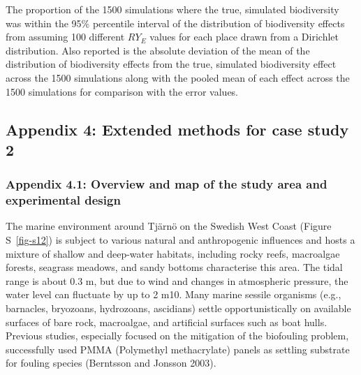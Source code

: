 \documentclass[
  letterpaper,
  DIV=11,
  numbers=noendperiod]{scrartcl}
\begin{document}
\begin{table}

\caption{\label{tbl-s7}The proportion of the 1500 simulations where the
true, simulated biodiversity was within the 95\% percentile interval of
the distribution of biodiversity effects from assuming 100 different
\(RY_E\) values for each place drawn from a Dirichlet distribution. Also
reported is the absolute deviation of the mean of the distribution of
biodiversity effects from the true, simulated biodiversity effect across
the 1500 simulations along with the pooled mean of each effect across
the 1500 simulations for comparison with the error values.}


\end{table}%

\subsection{Appendix 4: Extended methods for case study
2}\label{appendix-4-extended-methods-for-case-study-2}

\subsubsection{Appendix 4.1: Overview and map of the study area and
experimental
design}\label{appendix-4.1-overview-and-map-of-the-study-area-and-experimental-design}

The marine environment around Tjärnö on the Swedish West Coast (Figure
S~\ref{fig-s12}) is subject to various natural and anthropogenic
influences and hosts a mixture of shallow and deep-water habitats,
including rocky reefs, macroalgae forests, seagrass meadows, and sandy
bottoms characterise this area. The tidal range is about 0.3 m, but due
to wind and changes in atmospheric pressure, the water level can
fluctuate by up to 2 m10. Many marine sessile organisms (e.g.,
barnacles, bryozoans, hydrozoans, ascidians) settle opportunistically on
available surfaces of bare rock, macroalgae, and artificial surfaces
such as boat hulls. Previous studies, especially focused on the
mitigation of the biofouling problem, successfully used PMMA (Polymethyl
methacrylate) panels as settling substrate for fouling species
(Berntsson and Jonsson 2003).
\end{document}
